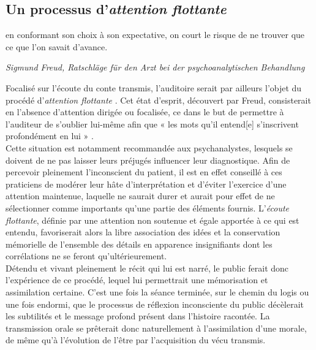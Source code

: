 \clearpage


\subsection{Un processus d'\textit{attention flottante}}

\begin{shadequote}
[...] en conformant son choix à son expectative, on court le risque de ne trouver que ce que l'on savait d'avance.
\par\emph{Sigmund Freud, Ratschl{\"a}ge f{\"u}r den Arzt bei der psychoanalytischen Behandlung}
\end{shadequote}

Focalisé sur l'écoute du conte transmis, l'auditoire serait par ailleurs l'objet du procédé d'\textit{attention flottante} \cite{freud1996ratschlage}. Cet état d'esprit, découvert par Freud, consisterait en l'absence d'attention dirigée ou focalisée, ce dans le but de permettre à l'auditeur de s'oublier lui-même afin que « les mots qu'il entend[e] s'inscrivent profondément en lui » \cite{benjamin1991gesammelte}.\\

Cette situation est notamment recommandée aux psychanalystes, lesquels se doivent de ne pas laisser leurs préjugés influencer leur diagnostique. Afin de percevoir pleinement l'inconscient du patient, il est en effet conseillé à ces praticiens de modérer leur hâte d'interprétation et d'éviter l'exercice d'une attention maintenue, laquelle ne saurait durer et aurait pour effet de ne sélectionner comme importants qu'une partie des éléments fournis. L'\textit{écoute flottante}, définie par une attention non soutenue et égale apportée à ce qui est entendu, favoriserait alors la libre association des idées et la conservation mémorielle de l'ensemble des détails en apparence insignifiants dont les corrélations ne se feront qu'ultérieurement.\\

Détendu et vivant pleinement le récit qui lui est narré, le public ferait donc l'expérience de ce procédé, lequel lui permettrait une mémorisation et assimilation certaine. C'est une fois la séance terminée, sur le chemin du logis ou une fois endormi, que le processus de réflexion inconsciente du public décèlerait les subtilités et le message profond présent dans l'histoire racontée. La transmission orale se prêterait donc naturellement à l'assimilation d'une morale, de même qu'à l'évolution de l'être par l'acquisition du vécu transmis.


